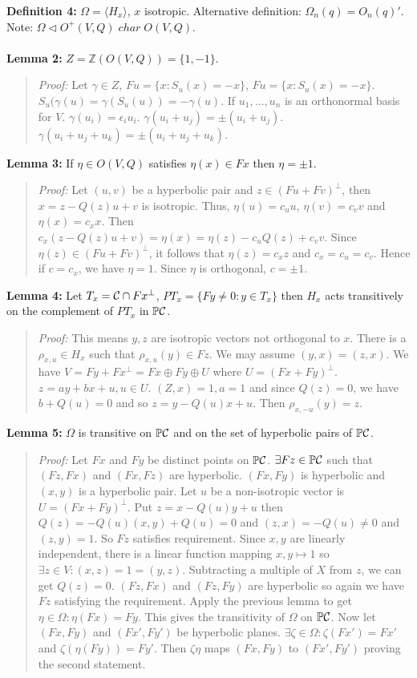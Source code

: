 {\bf Definition 4:}  $\Omega= \langle H_x \rangle $, $x$ isotropic. Alternative definition:
$\Omega_n(q)= O_n(q)'$.
Note: $\Omega \lhd O^+(V, Q) \; char \; O(V,Q)$.
\\
\\
{\bf Lemma 2:}
$Z= {\mathbb Z}(O(V,Q))= \{ 1, -1 \}$.
\begin{quote}
\emph{Proof:}  
Let $\gamma \in Z$, $Fu= \{x: S_u(x)= -x \}$, $Fu= \{x: S_u(x)= -x \}$.
$S_u(\gamma(u)= \gamma(S_u(u))= - \gamma(u)$.
If $u_1 , \ldots , u_n$ is an orthonormal basis for $V$. $\gamma(u_i )= \epsilon_i u_i$.
$\gamma(u_i + u_j )= \pm (u_i + u_j)$.  $\gamma(u_i + u_j + u_k ) = \pm (u_i + u_j + u_k)$.
\end{quote}
{\bf Lemma 3:}
If $\eta \in O(V,Q)$ satisfies $\eta(x) \in F x$ then $\eta= \pm 1$.
\begin{quote}
\emph{Proof:}  
Let $(u,v)$ be a hyperbolic pair and $z \in (Fu + Fv)^{\perp}$, then $x=z-Q(z)u+v$
is isotropic.  Thus, 
$\eta(u)= c_u u$,
$\eta(v)= c_v v$ and
$\eta(x)= c_x x$.  Then 
$c_x(z-Q(z)u+v)= \eta(x)= \eta(z) - c_u Q(z) + c_v v$.
Since $\eta(z) \in (Fu + Fv)^{\perp}$, it follows that $\eta(z) = c_x z$ and
$c_x = c_u = c_v$.  Hence if $c = c_x$,
we have $\eta=1$.  Since $\eta$ is orthogonal, $c= \pm 1$.
\end{quote}
{\bf Lemma 4:}
Let $T_x= {\cal C} \cap F x^{\perp}$, $PT_x= \{Fy \ne 0: y \in T_x \}$ then $H_x$ acts transitively
on the complement of $PT_x$ in ${\mathbb P}{\cal C}$.
\begin{quote}
\emph{Proof:}  
This means $y, z$ are isotropic vectors not orthogonal to $x$.  There is a $\rho_{x,u} \in H_x$
such that $\rho_{x,u}(y) \in Fz$.  We may assume $(y,x) = (z, x)$.   We have
$V= Fy + F x^{\perp} = Fx \oplus Fy \oplus U$ where $U= (Fx+Fy)^{\perp}$.  $z= ay + bx +u, u \in U$.
$(Z,x)=1, a=1$ and since $Q(z)=0$, we have $b + Q(u)=0$ and so
$z= y - Q(u) x +u$.  Then $\rho_{x, -u}(y)=z$.
\end{quote}
{\bf Lemma 5:}
$\Omega$ is transitive on ${\mathbb P}{\cal C}$ and on the set of hyperbolic pairs of ${\mathbb P}{\cal C}$.
\begin{quote}
\emph{Proof:}  
Let $Fx$ and $Fy$ be distinct points on ${\mathbb P}{\cal C}$.  $\exists Fz \in {\mathbb P}{\cal C}$ such that
$(Fz, Fx)$ and $(Fx, Fz)$ are hyperbolic.
$(Fx, Fy)$ is hyperbolic and $(x, y)$ is a hyperbolic pair.
Let $u$ be a non-isotropic vector is $U= (Fx + Fy)^{\perp}$.  Put $z= x- Q(u) y +u$ then
$Q(z)= -Q(u) (x, y) + Q(u) = 0$ and $(z,x)= -Q(u) \ne 0$ and $(z, y) = 1$.  So $Fz$
satisfies requirement.  Since $x, y$ are linearly independent, there is a linear function
mapping $x, y \mapsto 1$ so $\exists z \in V: (x,z) = 1 = (y,z)$.  Subtracting a
multiple of $X$ from $z$, we can get $Q(z) = 0$.
$(Fz, Fx)$ and $(Fz, Fy)$ are hyperbolic so again we have $Fz$ satisfying the requirement.
Apply the previous lemma to get $\eta \in \Omega: \eta(Fx)= Fy$.   This gives the
transitivity of $\Omega$ on ${\mathbb P}{\cal C}$.  Now let $(Fx, Fy)$ and $(Fx', Fy')$ be hyperbolic
planes.  $\exists \zeta \in \Omega:  \zeta(Fx')= Fx'$ and $\zeta(\eta(Fy))= Fy'$.
Then $\zeta \eta$ maps $(Fx, Fy)$ to $(Fx', Fy')$ proving the second statement.
\end{quote}
